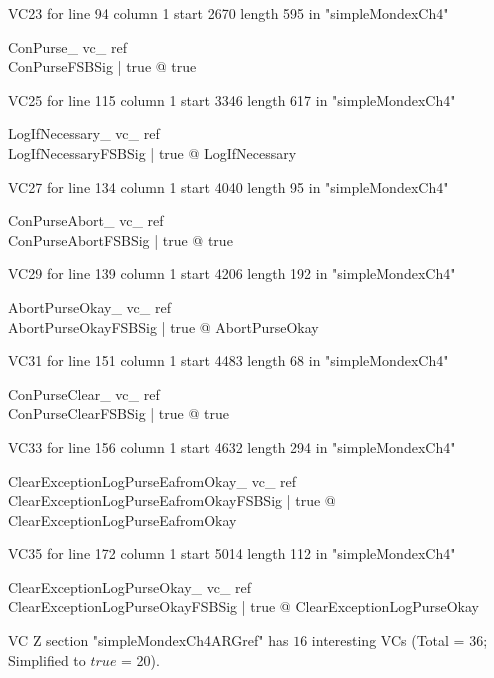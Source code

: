 \documentclass{article}
\begin{document}
VC23 for line 94 column 1 start 2670 length 595 in "simpleMondexCh4"
\begin{theorem}{ ConPurse\_ vc\_ ref}\\
 \exists ConPurseFSBSig | true @ true \\

\end{theorem}

VC25 for line 115 column 1 start 3346 length 617 in "simpleMondexCh4"
\begin{theorem}{ LogIfNecessary\_ vc\_ ref}\\
 \forall LogIfNecessaryFSBSig | true @ \pre LogIfNecessary \\

\end{theorem}

VC27 for line 134 column 1 start 4040 length 95 in "simpleMondexCh4"
\begin{theorem}{ ConPurseAbort\_ vc\_ ref}\\
 \exists ConPurseAbortFSBSig | true @ true \\

\end{theorem}

VC29 for line 139 column 1 start 4206 length 192 in "simpleMondexCh4"
\begin{theorem}{ AbortPurseOkay\_ vc\_ ref}\\
 \forall AbortPurseOkayFSBSig | true @ \pre AbortPurseOkay \\

\end{theorem}

VC31 for line 151 column 1 start 4483 length 68 in "simpleMondexCh4"
\begin{theorem}{ ConPurseClear\_ vc\_ ref}\\
 \exists ConPurseClearFSBSig | true @ true \\

\end{theorem}

VC33 for line 156 column 1 start 4632 length 294 in "simpleMondexCh4"
\begin{theorem}{ ClearExceptionLogPurseEafromOkay\_ vc\_ ref}\\
 \forall ClearExceptionLogPurseEafromOkayFSBSig | true @ \pre ClearExceptionLogPurseEafromOkay \\

\end{theorem}

VC35 for line 172 column 1 start 5014 length 112 in "simpleMondexCh4"
\begin{theorem}{ ClearExceptionLogPurseOkay\_ vc\_ ref}\\
 \forall ClearExceptionLogPurseOkayFSBSig | true @ \pre ClearExceptionLogPurseOkay \\

\end{theorem}



 VC Z section "simpleMondexCh4ARGref" has $16$ interesting VCs (Total = 36; Simplified to $true$ = 20).



\end{document}
